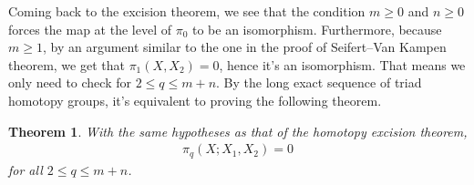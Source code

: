 \documentclass[12pt, notitlepage]{article}
\newtheorem{thm}{Theorem}[section]
\theoremstyle{definition}
\begin{document}
Coming back to the excision theorem, we see that the condition $m \geq 0$ and $n \geq 0$ forces the
map at the level of $\pi_0$ to be an isomorphism. Furthermore, because $m \geq 1$, by an argument
similar to the one in the proof of Seifert--Van Kampen theorem, we get that $\pi_1(X, X_2) = 0$,
hence it's an isomorphism.  That means we only need to check for $2 \leq q \leq m+n$. By the long
exact sequence of triad homotopy groups, it's equivalent to proving the following theorem.
\begin{thm}
  With the same hypotheses as that of the homotopy excision theorem,
  \begin{align*}
    \pi_q(X; X_1, X_2) = 0
  \end{align*}
  for all $2 \leq q \leq m+n$.
\end{thm}
\end{document}
